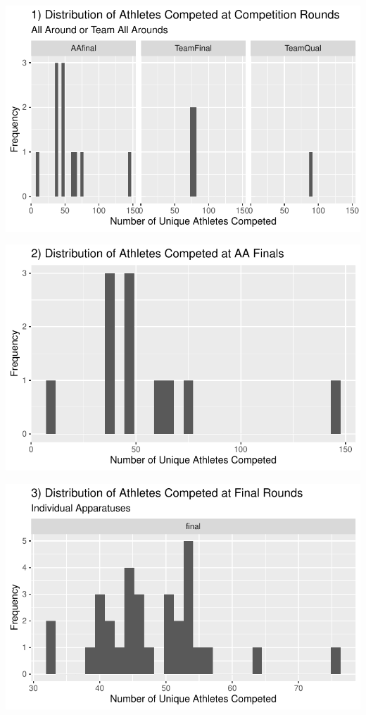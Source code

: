 \documentclass[
  letterpaper,
  DIV=11,
  numbers=noendperiod]{scrartcl}
\begin{document}
\includegraphics{Main_files/figure-pdf/unique-athletes-1.pdf}

\includegraphics{Main_files/figure-pdf/unique-athletes-2.pdf}

\includegraphics{Main_files/figure-pdf/unique-athletes-3.pdf}
\end{document}
